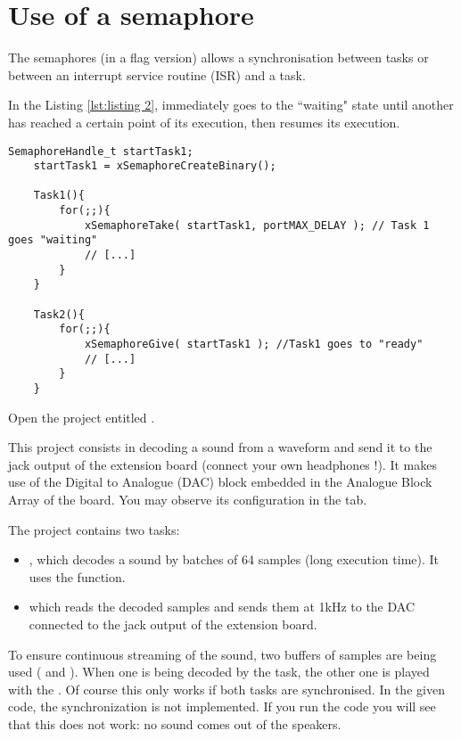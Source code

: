 \section{Use of a semaphore}

The semaphores (in a flag version) allows a synchronisation between tasks or between an interrupt service routine (ISR) and a task.

In the Listing \ref{lst:listing 2},  immediately goes to the ``waiting" state until another  has
reached a certain point of its execution, then  resumes its execution.

\begin{lstlisting}[caption={Semaphore example}, label={lst:listing 2}]
    SemaphoreHandle_t startTask1;
    startTask1 = xSemaphoreCreateBinary();
    
    Task1(){
        for(;;){
            xSemaphoreTake( startTask1, portMAX_DELAY ); // Task 1 goes "waiting"
            // [...]
        }
    }
    
    Task2(){
        for(;;){
            xSemaphoreGive( startTask1 ); //Task1 goes to "ready"
            // [...]
        }
    }
\end{lstlisting}


Open the project entitled .

This project consists in decoding a sound from a waveform and send it to the jack output of the extension board (connect your own headphones !).
It makes use of the Digital to Analogue (DAC) block embedded in the Analogue Block Array of the board.
You may observe its configuration in the  tab.

The project contains two tasks:
\begin{itemize}
    \item {}, which decodes a sound by batches of 64 samples (long execution time). It uses the  function.
    \item {} which reads the decoded samples and sends them at 1kHz to the DAC connected to the jack output of the extension board.
\end{itemize} 

To ensure continuous streaming of the sound, two buffers of samples are being used ( and ). 
When one is being decoded by the  task, the other one is played with the . 
Of course this only works if both tasks are synchronised.
In the given code, the synchronization is not implemented. If you run the code you will see that this does not work: no sound comes out of the speakers. 

